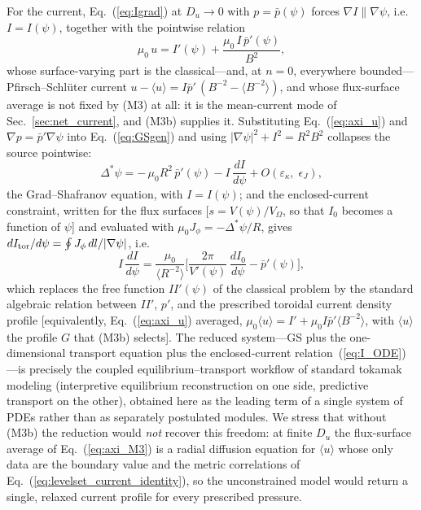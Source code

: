 \documentclass[english]{article}
\begin{document}
For the current, Eq.~(\ref{eq:Igrad}) at $D_u\rightarrow0$ with $p=\bar p(\psi)$ forces
$\nabla I\parallel\nabla\psi$, i.e.\ $I=I(\psi)$, together with the pointwise relation
\begin{equation}
\mu_0\,u=I'(\psi)+\frac{\mu_0\,I\,\bar p'(\psi)}{B^{2}} ,
\label{eq:axi_u}
\end{equation}
whose surface-varying part is the classical---and, at $n=0$, everywhere bounded---%
Pfirsch--Schl\"uter current $u-\langle u\rangle=I\bar p'\,(B^{-2}-\langle B^{-2}\rangle)$, and
whose flux-surface average is not fixed by (M3) at all: it is the mean-current mode of
Sec.~\ref{sec:net_current}, and (M3b) supplies it. Substituting Eq.~(\ref{eq:axi_u}) and
$\nabla p=\bar p'\nabla\psi$ into Eq.~(\ref{eq:GSgen}) and using
$|\nabla\psi|^{2}+I^{2}=R^{2}B^{2}$ collapses the source pointwise:
\begin{equation}
\Delta^*\psi=-\,\mu_0R^{2}\,\bar p'(\psi)-I\,\frac{dI}{d\psi}
+O(\varepsilon_\kappa,\;\epsilon_J) ,
\label{eq:GS_recovered}
\end{equation}
the Grad--Shafranov equation, with $I=I(\psi)$; and the enclosed-current constraint, written for
the flux surfaces [$s=V(\psi)/V_\Omega$, so that $I_0$ becomes a function of $\psi$] and evaluated
with $\mu_0J_\phi=-\Delta^*\psi/R$, gives $dI_{\rm tor}/d\psi=\oint J_\phi\,dl/|\nabla\psi|$, i.e.
\begin{equation}
I\,\frac{dI}{d\psi}
=\frac{\mu_0}{\langle R^{-2}\rangle}\Big[\frac{2\pi}{V'(\psi)}\,\frac{dI_0}{d\psi}-\bar p'(\psi)\Big] ,
\label{eq:I_ODE}
\end{equation}
which replaces the free function $II'(\psi)$ of the classical problem by the standard algebraic
relation between $II'$, $p'$, and the prescribed toroidal current density profile [equivalently,
Eq.~(\ref{eq:axi_u}) averaged, $\mu_0\langle u\rangle=I'+\mu_0I\bar p'\langle B^{-2}\rangle$,
with $\langle u\rangle$ the profile $G$ that (M3b) selects]. The reduced system---GS plus the
one-dimensional transport equation plus the enclosed-current relation~(\ref{eq:I_ODE})---is
precisely the coupled equilibrium--transport workflow of standard tokamak modeling (interpretive
equilibrium reconstruction on one side, predictive transport on the other), obtained here as the
leading term of a single system of PDEs rather than as separately postulated modules. We stress
that without (M3b) the reduction would \emph{not} recover this freedom: at finite $D_u$ the
flux-surface average of Eq.~(\ref{eq:axi_M3}) is a radial diffusion equation for $\langle u\rangle$
whose only data are the boundary value and the metric correlations of
Eq.~(\ref{eq:levelset_current_identity}), so the unconstrained model would return a single,
relaxed current profile for every prescribed pressure.
\end{document}

